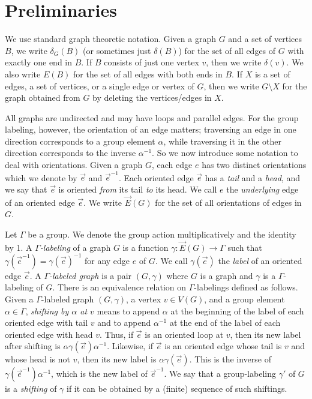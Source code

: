 \documentclass[11pt]{article}
\theoremstyle{definition}
\begin{document}
\section{Preliminaries}
\label{sec:prelim}

We use standard graph theoretic notation. Given a graph $G$ and a set of vertices $B$, we write $\delta_G(B)$ (or sometimes just $\delta(B)$) for the set of all edges of $G$ with exactly one end in $B$. If $B$ consists of just one vertex $v$, then we write $\delta(v)$. We also write $E(B)$ for the set of all edges with both ends in $B$. If $X$ is a set of edges, a set of vertices, or a single edge or vertex of $G$, then we write $G\setminus X$ for the graph obtained from $G$ by deleting the vertices/edges in $X$.

All graphs are undirected and may have loops and parallel edges. For the group labeling, however, the orientation of an edge matters; traversing an edge in one direction corresponds to a group element $\alpha$, while traversing it in the other direction corresponds to the inverse $\alpha^{-1}$. So we now introduce some notation to deal with orientations. Given a graph $G$, each edge $e$ has two distinct orientations which we denote by $\vec{e}$ and $\vec{e}^{-1}$. Each oriented edge $\vec{e}$ has a \emph{tail} and a \emph{head}, and we say that $\vec{e}$ is oriented \emph{from} its tail \emph{to} its head. We call $e$ the \textit{underlying} edge of an oriented edge $\vec{e}$. We write $\vec{E}(G)$ for the set of all orientations of edges in $G$. 



Let $\Gamma$ be a group. We denote the group action multiplicatively and the identity by 1. A \emph{$\Gamma$-labeling} of a graph $G$ is a function $\gamma: \vec{E}(G) \rightarrow \Gamma$ such that $\gamma(\vec{e}^{-1}) = \gamma(\vec{e})^{-1}$ for any edge $e$ of $G$. We call $\gamma(\vec{e})$ the \textit{label} of an oriented edge $\vec{e}$. A \textit{$\Gamma$-labeled graph} is a pair $(G, \gamma)$ where $G$ is a graph and $\gamma$ is a $\Gamma$-labeling of $G$. There is an equivalence relation on $\Gamma$-labelings defined as follows. Given a $\Gamma$-labeled graph $(G,\gamma)$, a vertex $v \in V(G)$, and a group element $\alpha \in \Gamma$, \textit{shifting by $\alpha$ at $v$} means to append $\alpha$ at the beginning of the label of each oriented edge with tail $v$ and to append $\alpha^{-1}$ at the end of the label of each oriented edge with head $v$. Thus, if $\vec{e}$ is an oriented loop at $v$, then its new label after shifting is $\alpha\gamma(\vec{e})\alpha^{-1}$. Likewise, if $\vec{e}$ is an oriented edge whose tail is $v$ and whose head is not $v$, then its new label is $\alpha\gamma(\vec{e})$. This is the inverse of $\gamma(\vec{e}^{-1})\alpha^{-1}$, which is the new label of $\vec{e}^{-1}$. We say that a group-labeling $\gamma'$ of $G$ is a \emph{shifting} of $\gamma$ if it can be obtained by a (finite) sequence of such shiftings. 
\end{document}
